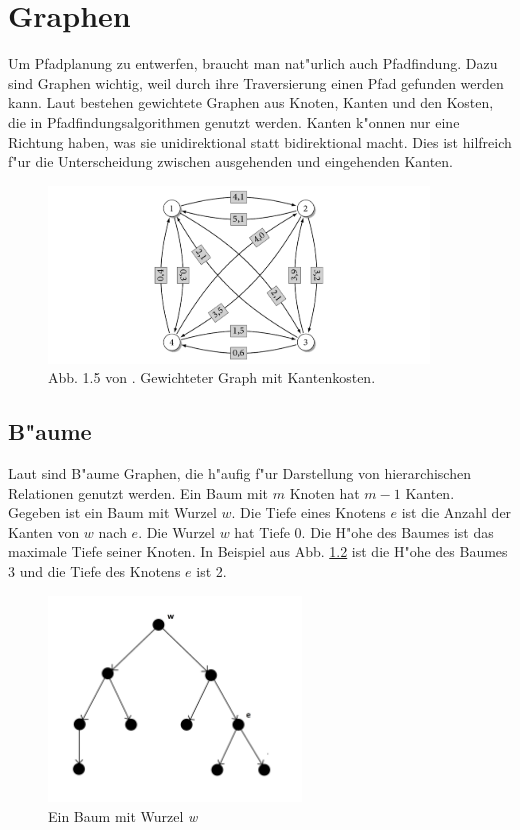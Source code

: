 \chapter{Graphen}
Um Pfadplanung zu entwerfen, braucht man nat"urlich auch Pfadfindung. Dazu sind Graphen wichtig, weil durch ihre Traversierung einen Pfad gefunden werden kann. Laut \cite{Turau:15} bestehen gewichtete Graphen aus Knoten, Kanten und den Kosten, die in Pfadfindungsalgorithmen genutzt werden. Kanten k"onnen nur eine Richtung haben, was sie unidirektional statt bidirektional macht. Dies ist hilfreich f"ur die Unterscheidung zwischen ausgehenden und eingehenden Kanten.

\begin{figure} %
	\centering
	\includegraphics[width=0.9\textwidth]{images/kk_graph_S6.png}
	\caption{Abb. 1.5 von \cite[~S. 6]{Turau:15}. Gewichteter Graph mit Kantenkosten.}
	\label{sec0a}
\end{figure}

\section{B"aume}
Laut \cite{Turau:15} sind B"aume Graphen, die h"aufig f"ur Darstellung von hierarchischen Relationen genutzt werden. Ein Baum mit $m$ Knoten hat $m-1$ Kanten.\\
Gegeben ist ein Baum mit Wurzel $w$. Die Tiefe eines Knotens $e$ ist die Anzahl der Kanten von $w$ nach $e$. Die Wurzel $w$ hat Tiefe 0. Die H"ohe des Baumes ist das maximale Tiefe seiner Knoten. In Beispiel aus Abb. \ref{sec0b} ist die H"ohe des Baumes 3 und die Tiefe des Knotens $e$ ist 2.

\begin{figure} %
	\centering
	\includegraphics[width=0.6\textwidth]{images/Tree_Graph.png}
	\caption{Ein Baum mit Wurzel \textit{w}}
	\label{sec0b}
\end{figure}

